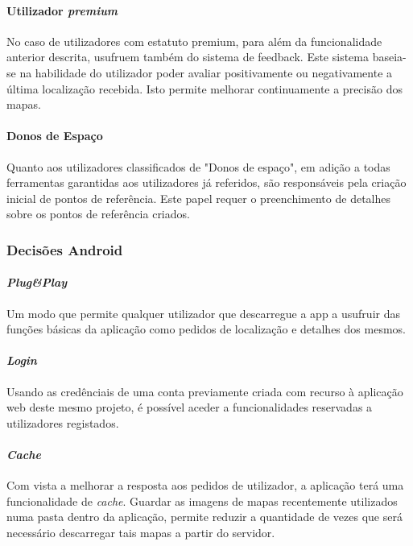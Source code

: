 \documentclass[12pt]{article} %
\begin{document}
\paragraph{Utilizador \textit{premium}}
No caso de utilizadores com estatuto premium, para além da funcionalidade anterior descrita, usufruem também do sistema de feedback. Este sistema baseia-se na habilidade do utilizador poder avaliar positivamente ou negativamente a última localização recebida. Isto permite melhorar continuamente a precisão dos mapas.\par

\paragraph{Donos de Espaço}
Quanto aos utilizadores classificados de "Donos de espaço", em adição a todas ferramentas garantidas aos utilizadores já referidos, são responsáveis pela criação inicial de pontos de referência. Este papel requer o preenchimento de detalhes sobre os pontos de referência criados.\par

\pagebreak

\subsubsection{Decisões Android}

\paragraph{\textit{Plug\&Play}}
Um modo que permite qualquer utilizador que descarregue a app a usufruir das funções básicas da aplicação como pedidos de localização e detalhes dos mesmos.\par

\paragraph{\textit{Login}}
Usando as credênciais de uma conta previamente criada com recurso à aplicação web deste mesmo projeto, é possível aceder a funcionalidades reservadas a utilizadores registados.\par

\paragraph{\textit{Cache}}
Com vista a melhorar a resposta aos pedidos de utilizador, a aplicação terá uma funcionalidade de \textit{cache}. Guardar as imagens de mapas recentemente utilizados numa pasta dentro da aplicação, permite reduzir a quantidade de vezes que será necessário descarregar tais mapas a partir do servidor.
\end{document}
